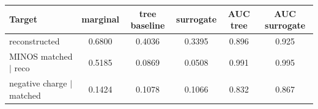 \begin{tabular}{lccccc}
\toprule
Target & marginal & tree baseline & surrogate & AUC tree & AUC surrogate \\
\midrule
reconstructed & 0.6800 & 0.4036 & 0.3395 & 0.896 & 0.925 \\
MINOS matched $\mid$ reco & 0.5185 & 0.0869 & 0.0508 & 0.991 & 0.995 \\
negative charge $\mid$ matched & 0.1424 & 0.1078 & 0.1066 & 0.832 & 0.867 \\
\bottomrule
\end{tabular}
